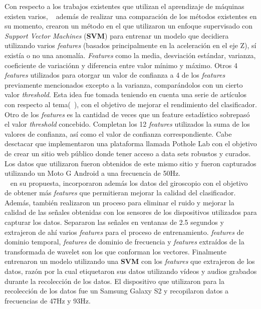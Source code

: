 Con respecto a los trabajos existentes que utilizan el aprendizaje de máquinas existen varios, ~ además de realizar
una comparación de los métodos existentes en su momento, crearon un método en el que utilizaron un enfoque supervisado con \emph{Support Vector Machines} 
(\textbf{SVM}) para entrenar un modelo que decidiera utilizando varios \emph{features} (basados principalmente en la aceleración en el eje Z), sí existía
o no una anomalía. \emph{Features} como la media, desviación estándar, varianza, coeficiente de variaciónn y diferencia entre valor mínimo y máximo. Otros
4 \emph{features} utilizados para otorgar un valor de confianza a 4 de los \emph{features} previamente mencionados excepto a la varianza, comparándolos con
un cierto valor \emph{threshold}. Esta idea fue tomada teniendo en cuenta una serie de artículos con respecto al tema(~), con el
objetivo de mejorar el rendimiento del clasificador. Otro de los \emph{features} es la cantidad de veces que un feature estadístico sobrepasó el valor
\emph{threshold} concebido. Completan los 12 \emph{features} utilizados la suma de los valores de confianza, así como el valor de confianza correspondiente.
Cabe desctacar que implementaron una plataforma llamada Pothole Lab con el objetivo de crear un sitio web público donde tener acceso a data sets robustos y
curados. Los datos que utilizaron fueron obtenidos de este mismo sitio y fueron capturados utilizando un Moto G Android a una frecuencia de 50Hz.\\

~ en su propuesta, incorporaron además los datos del giroscopio con el objetivo de obtener más \emph{features} que permitieran mejorar
la calidad del clasificador. Además, también realizaron un proceso para eliminar el ruido y mejorar la calidad de las señales obtenidas con los sensores de los
dispositivos utilizados para capturar los datos. Separaron las señales en ventanas de 2.5 segundos y extrajeron de ahí varios \emph{features} para el proceso
de entrenamiento. \emph{features} de dominio temporal, \emph{features} de dominio de frecuencia y \emph{features} extraídos de la transformada de wavelet son
los que conforman los vectores. Finalmente entrenaron un modelo utilizando una \textbf{SVM} con los \emph{features} que extrajeron de los datos, razón por la
cual etiquetaron sus datos utilizando vídeos y audios grabados durante la recolección de los datos. El dispositivo que utilizaron para la recolección de los
datos fue un Samsung Galaxy S2 y recopilaron datos a frecuencias de 47Hz y 93Hz.\\

